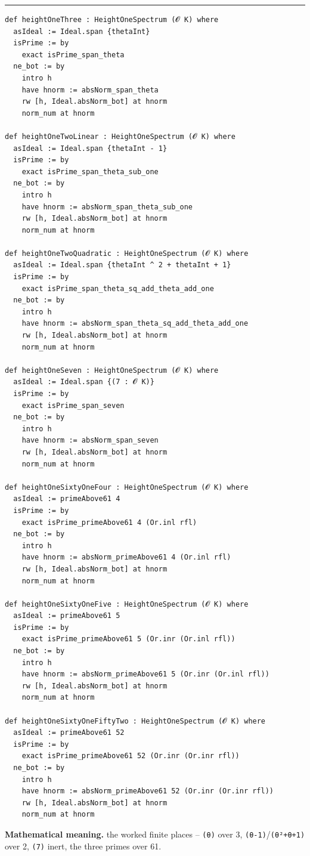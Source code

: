 \documentclass[UTF8,a4paper,11pt,fontset=fandol]{ctexart}
\theoremstyle{definition}
\newcommand{\statementsep}{\par\medskip\hrule\medskip}
\begin{document}
\statementsep
\begin{verbatim}
def heightOneThree : HeightOneSpectrum (𝓞 K) where
  asIdeal := Ideal.span {thetaInt}
  isPrime := by
    exact isPrime_span_theta
  ne_bot := by
    intro h
    have hnorm := absNorm_span_theta
    rw [h, Ideal.absNorm_bot] at hnorm
    norm_num at hnorm

def heightOneTwoLinear : HeightOneSpectrum (𝓞 K) where
  asIdeal := Ideal.span {thetaInt - 1}
  isPrime := by
    exact isPrime_span_theta_sub_one
  ne_bot := by
    intro h
    have hnorm := absNorm_span_theta_sub_one
    rw [h, Ideal.absNorm_bot] at hnorm
    norm_num at hnorm

def heightOneTwoQuadratic : HeightOneSpectrum (𝓞 K) where
  asIdeal := Ideal.span {thetaInt ^ 2 + thetaInt + 1}
  isPrime := by
    exact isPrime_span_theta_sq_add_theta_add_one
  ne_bot := by
    intro h
    have hnorm := absNorm_span_theta_sq_add_theta_add_one
    rw [h, Ideal.absNorm_bot] at hnorm
    norm_num at hnorm

def heightOneSeven : HeightOneSpectrum (𝓞 K) where
  asIdeal := Ideal.span {(7 : 𝓞 K)}
  isPrime := by
    exact isPrime_span_seven
  ne_bot := by
    intro h
    have hnorm := absNorm_span_seven
    rw [h, Ideal.absNorm_bot] at hnorm
    norm_num at hnorm

def heightOneSixtyOneFour : HeightOneSpectrum (𝓞 K) where
  asIdeal := primeAbove61 4
  isPrime := by
    exact isPrime_primeAbove61 4 (Or.inl rfl)
  ne_bot := by
    intro h
    have hnorm := absNorm_primeAbove61 4 (Or.inl rfl)
    rw [h, Ideal.absNorm_bot] at hnorm
    norm_num at hnorm

def heightOneSixtyOneFive : HeightOneSpectrum (𝓞 K) where
  asIdeal := primeAbove61 5
  isPrime := by
    exact isPrime_primeAbove61 5 (Or.inr (Or.inl rfl))
  ne_bot := by
    intro h
    have hnorm := absNorm_primeAbove61 5 (Or.inr (Or.inl rfl))
    rw [h, Ideal.absNorm_bot] at hnorm
    norm_num at hnorm

def heightOneSixtyOneFiftyTwo : HeightOneSpectrum (𝓞 K) where
  asIdeal := primeAbove61 52
  isPrime := by
    exact isPrime_primeAbove61 52 (Or.inr (Or.inr rfl))
  ne_bot := by
    intro h
    have hnorm := absNorm_primeAbove61 52 (Or.inr (Or.inr rfl))
    rw [h, Ideal.absNorm_bot] at hnorm
    norm_num at hnorm
\end{verbatim}
\noindent\textbf{Mathematical meaning.} the worked finite places -- \texttt{(θ)} over 3, \texttt{(θ-1)}/\texttt{(θ²+θ+1)} over 2, \texttt{(7)} inert, the three primes over 61.\par
\end{document}
